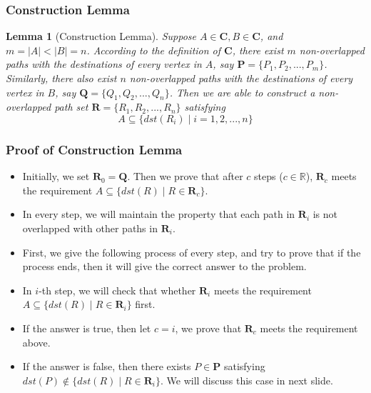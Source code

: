 \documentclass[notheorems]{beamer}
\newtheorem{lemma}[theorem]{Lemma}
\begin{document}
\begin{frame}
\frametitle{Construction Lemma}
\begin{lemma}[Construction Lemma]
Suppose $A \in \mathbf{C}, B \in \mathbf{C}$, and $m = |A| < |B| = n$. According to the definition of $\mathbf{C}$, there exist $m$ non-overlapped paths with the destinations of every vertex in $A$, say $\mathbf{P} = \{P_1, P_2, ..., P_m\}$. Similarly, there also exist $n$ non-overlapped paths with the destinations of every vertex in $B$, say $\mathbf{Q} = \{Q_1, Q_2, ..., Q_n\}$. Then we are able to construct a non-overlapped path set $\mathbf{R} = \{R_1, R_2, ..., R_n\}$ satisfying
\begin{displaymath}
A \subseteq \{dst(R_i) \mid i = 1,2,...,n\}
\end{displaymath}
\end{lemma}
\end{frame}

\begin{frame}
\frametitle{Proof of Construction Lemma}
\begin{itemize}
\item Initially, we set $\mathbf{R}_0 = \mathbf{Q}$. Then we prove that after $c$ steps ($c \in \mathbb{R}$), $\mathbf{R}_c$ meets the requirement $A \subseteq \{dst(R) \mid R \in \mathbf{R}_c\}$.
\item In every step, we will maintain the {\color{blue}property} that each path in $\mathbf{R}_i$ is not overlapped with other paths in $\mathbf{R}_i$.
\item First, we give the following process of every step, and try to prove that if the process ends, then it will give the correct answer to the problem.
\item In $i$-th step, we will check that whether $\mathbf{R}_i$ meets the requirement $A \subseteq \{dst(R) \mid R \in \mathbf{R}_i\}$ first.
\item If the answer is true, then let $c = i$, we prove that $\mathbf{R}_c$ meets the requirement above.
\item If the answer is false, then there exists $P \in \mathbf{P}$ satisfying $dst(P) \notin \{dst(R) \mid R \in \mathbf{R}_i\}$. We will discuss this case in next slide.
\end{itemize}
\end{frame}
\end{document}
